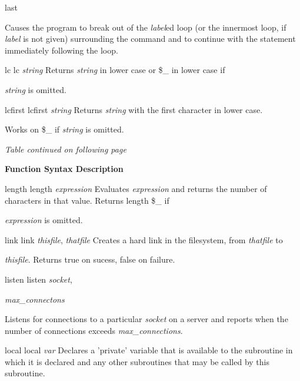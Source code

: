 \documentclass[a4paper,11pt]{book}
\begin{document}
\noindent last

\noindent 

\noindent Causes the program to break out of the \textit{label}ed loop (or the innermost loop, if \textit{label }is not given) surrounding the command and to continue with the statement immediately following the loop.

\noindent 

\noindent lc lc \textit{string }Returns \textit{string }in lower case or \$\_ in lower case if

\noindent \textit{string }is omitted.

\noindent 

\noindent lcfirst lcfirst \textit{string }Returns \textit{string }with the first character in lower case.

\noindent Works on \$\_ if \textit{string }is omitted.

\noindent \textit{Table continued on following page}

\noindent 

\noindent 

\noindent \textbf{Function Syntax Description}

\noindent 

\noindent length length \textit{expression }Evaluates \textit{expression }and returns the number of characters in that value. Returns length \$\_ if

\noindent \textit{expression }is omitted.

\noindent 

\noindent link link \textit{thisfile}, \textit{thatfile }Creates a hard link in the filesystem, from \textit{thatfile }to

\noindent \textit{thisfile}. Returns true on sucess, false on failure.

\noindent 

\noindent listen listen \textit{socket},

\noindent \textit{max\_connectons}

\noindent 

\noindent Listens for connections to a particular \textit{socket }on a server and reports when the number of connections exceeds \textit{max\_connections}.

\noindent local local \textit{var }Declares a 'private' variable that is available to the subroutine in which it is declared and any other subroutines that may be called by this subroutine.

\noindent 
\end{document}
